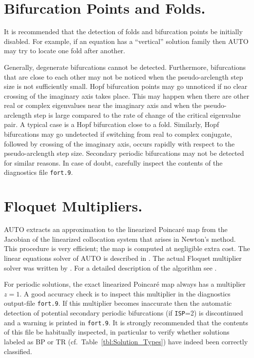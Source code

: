 \documentclass[12pt]{report}
\begin{document}
\section{ Bifurcation Points and Folds.} \label{sec:Bifurcations}
It is recommended that the detection of folds 
and bifurcation points be initially disabled.
For example, if an equation has a ``vertical'' solution family
then {\cal AUTO} may try to locate one fold after another.

Generally, degenerate bifurcations cannot be detected.
Furthermore, bifurcations that are close to each other may not
be noticed when the pseudo-arclength step size is not sufficiently small.
Hopf bifurcation points may go unnoticed if no clear crossing of
the imaginary axis takes place. This may happen when there are other
real or complex eigenvalues near the imaginary axis and when 
the pseudo-arclength step is large compared to the rate
of change of the critical eigenvalue pair.
A typical  case is a Hopf bifurcation close to a fold.
Similarly, Hopf bifurcations may go undetected if switching from
real to complex conjugate, followed by crossing of the imaginary
axis, occurs rapidly with respect to the pseudo-arclength step size.
Secondary periodic bifurcations may not be detected for similar reasons.
In case of doubt, carefully inspect the contents of the diagnostics file
{\tt fort.9}.
 
\section{ Floquet Multipliers.} \label{sec:Floquet_multipliers}

{\cal AUTO} extracts an approximation to the linearized Poincar\'e map from 
the Jacobian of the linearized collocation system that arises in Newton's method.
This procedure is very efficient; the map is computed at negligible extra cost.
The linear equations solver of {\cal AUTO} is described in 
 \citeyear{DoKeKe:91b}.
The actual Floquet multiplier solver was written by
 \citeyear{Fa:94}.
For a detailed description of the algorithm see 
 \citeyear{FaJe:91}.

For periodic solutions, the exact linearized Poincar\'e map always has 
a multiplier $z=1$.
A good accuracy check is to inspect this 
multiplier in the diagnostics output-file {\tt fort.9}.
If this multiplier becomes inaccurate then the automatic detection 
of potential secondary periodic bifurcations (if {\tt ISP}=2) is discontinued 
and a warning is printed in {\tt fort.9}.
It is strongly recommended that the contents of this file be
habitually inspected,
in particular to verify whether solutions labeled as BP or TR 
(cf.~Table~\ref{tbl:Solution_Types}) have indeed  been correctly classified.
 
\end{document}
